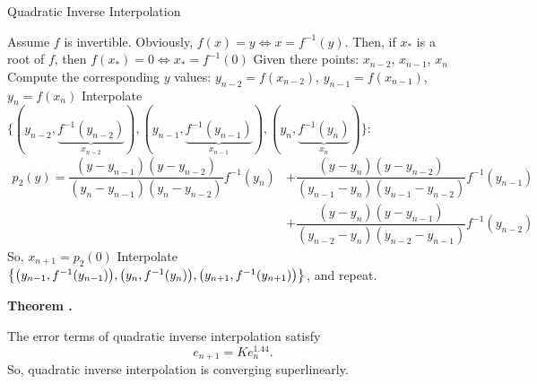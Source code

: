 \documentclass[12pt, a4paper]{article}
\newcounter{index}[subsection]
\newenvironment*{thm}[1]{\begin{tcolorbox}\par\noindent\textbf{Theorem \thesubsection.\stepcounter{index}\theindex\ #1} \par}{\par\end{tcolorbox}}
\begin{document}
\begin{algorithm}
	\caption{Quadratic Inverse Interpolation}
	Assume $f$ is invertible. Obviously, $f(x)=y\iff x=f^{-1}(y)$. Then, if $x_*$ is a root of $f$, then $f(x_*)=0\iff x_*=f^{-1}(0)$\;
	Given there points: $x_{n-2}$, $x_{n-1}$, $x_n$\;
	Compute the corresponding $y$ values: $y_{n-2}=f(x_{n-2})$, $y_{n-1}=f(x_{n-1})$, $y_n=f(x_n)$\;
	Interpolate $\{(y_{n-2}, \underbrace{f^{-1}(y_{n-2})}_{x_{n-2}}), (y_{n-1}, \underbrace{f^{-1}(y_{n-1})}_{x_{n-1}}), (y_{n}, \underbrace{f^{-1}(y_{n})}_{x_{n}})\}$: \begin{align*}p_2(y)=\dfrac{(y-y_{n-1})(y-y_{n-2})}{(y_{n}-y_{n-1})(y_{n}-y_{n-2})}f^{-1}(y_{n})&+\dfrac{(y-y_{n})(y-y_{n-2})}{(y_{n-1}-y_{n})(y_{n-1}-y_{n-2})}f^{-1}(y_{n-1})\\&+\dfrac{(y-y_{n})(y-y_{n-1})}{(y_{n-2}-y_{n})(y_{n-2}-y_{n-1})}f^{-1}(y_{n-2})\end{align*} So, $x_{n+1}=p_2(0)$\;
	Interpolate $\qty{\qty(y_{n-1},f^{-1}(y_{n-1})), \qty(y_{n},f^{-1}(y_{n})), \qty(y_{n+1},f^{-1}(y_{n+1}))}$, and repeat.
\end{algorithm}
\begin{thm}{}
	The error terms of quadratic inverse interpolation satisfy \[e_{n+1}=Ke_{n}^{1.44}.\] So, quadratic inverse interpolation is converging superlinearly. 
\end{thm}
\end{document}
